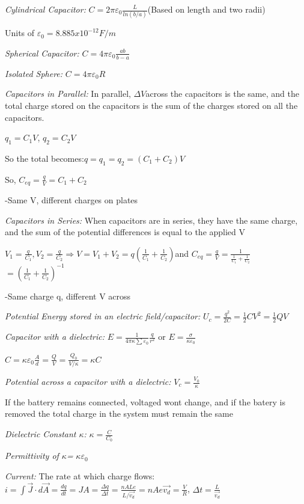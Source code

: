 \documentclass[english]{article}
\begin{document}
\emph{Cylindrical Capacitor:} $C=2\pi\varepsilon_{0}\frac{L}{ln(b/a)}$(Based
on length and two radii)

Units of $\varepsilon_{0}=8.885x10^{-12}F/m$ 

\emph{Spherical Capacitor: }$C=4\pi\varepsilon_{0}\frac{ab}{b-a}$

\emph{Isolated Sphere:} $C=4\pi\varepsilon_{0}R$

\emph{Capacitors in Parallel:} In parallel, $\varDelta V$across the
capacitors is the same, and the total charge stored on the capacitors
is the sum of the charges stored on all the capacitors. 

$q_{1}=C_{1}V$, $q_{2}=C_{2}V$

So the total becomes:$q=q_{1}=q_{2}=(C_{1}+C_{2})V$

So, $C_{eq}=\frac{q}{V}=C_{1}+C_{2}$

-Same V, different charges on plates

\emph{Capacitors in Series:} When capacitors are in series, they have
the same charge, and the sum of the potential differences is equal
to the applied V

$V_{1}=\frac{q}{C_{1}},V_{2}=\frac{q}{C_{2}}$$\Rightarrow V=V_{1}+V_{2}=q(\frac{1}{C_{1}}+\frac{1}{C_{2}})$and
$C_{eq}=\frac{q}{V}=\frac{1}{\frac{1}{C_{1}}+\frac{1}{C_{2}}}$$=(\frac{1}{C_{1}}+\frac{1}{C_{2}})^{-1}$

-Same charge q, different V across

\emph{Potential Energy stored in an electric field/capacitor: }$U_{c}=\frac{q^{2}}{2C}=\frac{1}{2}CV^{2}=\frac{1}{2}QV$

\emph{Capacitor with a dielectric:} $E=\frac{1}{4\pi\kappa\sum\varepsilon_{0}}\frac{q}{r^{2}}$
or $E=\frac{\sigma}{\kappa\varepsilon_{0}}$

$C=\kappa\varepsilon_{0}\frac{A}{d}=\frac{Q}{V}=\frac{Q_{0}}{V/\kappa}=\kappa C$

\emph{Potential across a capacitor with a dielectric: }$V_{c}=\frac{V_{0}}{\kappa}$

If the battery remains connected, voltaged wont change, and if the
batery is removed the total charge in the system must remain the same

\emph{Dielectric Constant $\kappa$: }$\kappa=\frac{C}{C_{0}}$

\emph{Permittivity of $\kappa$=} $\kappa\varepsilon_{0}$

\emph{Current:} The rate at which charge flows: $i=\int\overrightarrow{J}\cdot d\overrightarrow{A}=\frac{dq}{dt}=JA=\frac{\varDelta q}{\varDelta t}=\frac{nALe}{L/\vec{v_{d}}}=nAe\overrightarrow{v_{d}}=\frac{V}{R}$,
$\Delta t=\frac{L}{\overrightarrow{v_{d}}}$
\end{document}
